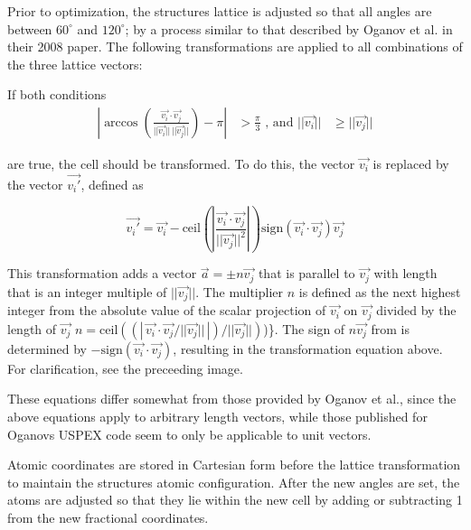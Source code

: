  Prior to optimization, the structure\textquotesingle{}s lattice is adjusted so that all angles are between $60^\circ$ and $120^\circ$; by a process similar to that described by Oganov et al. in their 2008 paper. The following transformations are applied to all combinations of the three lattice vectors\+:

If both conditions \begin{eqnarray} \left| \arccos\left(\frac{\vec{v_i}\cdot \vec{v_j}} {||\vec{v_i}||\,||\vec{v_j}||} \right) - \pi \right| &> \frac{\pi}{3} \mbox{\ ,\ and\ } ||\vec{v_i}|| &\geq ||\vec{v_j}|| \end{eqnarray}

are true, the cell should be transformed. To do this, the vector $\vec{v_i}$ is replaced by the vector $\vec{v_i'}$, defined as

\[ \vec{v_i'} = \vec{v_i} - \mbox{ceil}\left(\left|\frac{\vec{v_i}\cdot \vec{v_j}} {||\vec{v_j}||^2}\right|\right)\mbox{sign}(\vec{v_i}\cdot \vec{v_j})\vec{v_j} \]

This transformation adds a vector $\vec{a} = \pm n \vec{v_j}$ that is parallel to $\vec{v_j}$ with length that is an integer multiple of $||\vec{v_j}||$. The multiplier $n$ is defined as the next highest integer from the absolute value of the scalar projection of $\vec{v_i}$ on $\vec{v_j}$ divided by the length of $\vec{v_j}$ $n = \mbox{ceil}\left(\left(\left|\,\vec{v_i}\cdot \vec{v_j}/ ||\vec{v_j}||\,\right|\right)/||\vec{v_j}||\right)$)\}. The sign of $n\vec{v_j}$ from is determined by $-\mbox{sign}(\vec{v_i}\cdot\vec{v_j})$, resulting in the transformation equation above. For clarification, see the preceeding image.

These equations differ somewhat from those provided by Oganov et al., since the above equations apply to arbitrary length vectors, while those published for Oganov\textquotesingle{}s U\+S\+P\+E\+X code seem to only be applicable to unit vectors.

Atomic coordinates are stored in Cartesian form before the lattice transformation to maintain the structure\textquotesingle{}s atomic configuration. After the new angles are set, the atoms are adjusted so that they lie within the new cell by adding or subtracting 1 from the new fractional coordinates. 